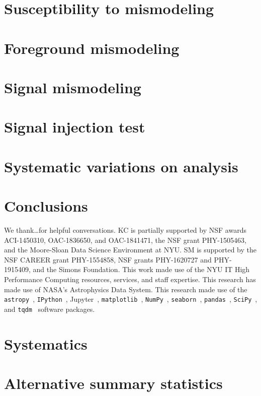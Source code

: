 \documentclass[prd,aps,10pt,nofootinbib,twocolumn,superscriptaddress,preprintnumbers,balancelastpage,longbibliography]{revtex4-1}
\begin{document}
\section{Susceptibility to mismodeling}
\label{sec:mismodeling}

\section{Foreground mismodeling}
\label{sec:fg-mismodeling}

\section{Signal mismodeling}
\label{sec:sig-mismodeling}

\section{Signal injection test}
\label{sec:sig-injection}


\section{Systematic variations on analysis}
\label{sec:systematics}

\section{Conclusions}
\label{sec:conclusion}

\vspace{.3cm}

\begin{acknowledgments}

We thank\ldots for helpful conversations.  
KC is partially supported by NSF awards ACI-1450310, OAC-1836650, and OAC-1841471, the NSF grant PHY-1505463, and the Moore-Sloan Data Science Environment at NYU. 
SM is supported by the NSF CAREER grant PHY-1554858, NSF grants PHY-1620727 and PHY-1915409, and the Simons Foundation. 
This work made use of the NYU IT High Performance Computing resources, services, and staff expertise. 
This research has made use of NASA's Astrophysics Data System. 
This research made use of the \texttt{astropy}~\cite{Price-Whelan:2018hus,Robitaille:2013mpa}, \texttt{IPython}~\cite{PER-GRA:2007}, Jupyter~\cite{Kluyver2016JupyterN}, \texttt{matplotlib}~\cite{Hunter:2007}, \texttt{NumPy}~\cite{numpy:2011}, \texttt{seaborn}~\cite{seaborn}, \texttt{pandas}~\cite{pandas:2010}, \texttt{SciPy}~\cite{2020SciPy-NMeth}, and \texttt{tqdm}~\cite{da2019tqdm}  software packages. 
\end{acknowledgments}

\appendix

\section{Systematics}
\label{app:systematics}

\section{Alternative summary statistics}
\label{app:summaries}



\end{document}
